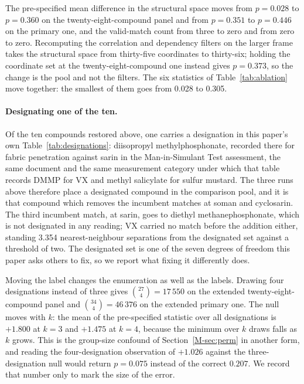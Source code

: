 \documentclass[11pt,a4paper]{article}
\begin{document}
The pre-specified mean difference in the structural space moves from
$p = 0.028$ to $p = 0.360$ on the twenty-eight-compound panel and from
$p = 0.351$ to $p = 0.446$ on the primary one, and the valid-match count from
three to zero and from zero to zero. Recomputing the correlation and dependency
filters on the larger frame takes the structural space from thirty-five
coordinates to thirty-six; holding the coordinate set at the
twenty-eight-compound one instead gives $p = 0.373$, so the change is the pool
and not the filters. The six statistics of Table~\ref{tab:ablation} move
together: the smallest of them goes from 0.028 to 0.305.

\paragraph{Designating one of the ten.} Of the ten compounds restored above,
one carries a designation in this paper's own Table~\ref{tab:designations}:
diisopropyl methylphosphonate, recorded there for fabric penetration against
sarin in the Man-in-Simulant Test assessment, the same document and the same
measurement category under which that table records DMMP for VX and methyl
salicylate for sulfur mustard. The three runs above therefore place a
designated compound in the comparison pool, and it is that compound which
removes the incumbent matches at soman and cyclosarin. The third incumbent
match, at sarin, goes to diethyl methanephosphonate, which is not designated in
any reading; VX carried no match before the addition either, standing 3.354
nearest-neighbour separations from the designated set against a threshold of
two. The designated set
is one of the seven degrees of freedom this paper asks others to fix, so we
report what fixing it differently does.

Moving the label changes the enumeration as well as the labels. Drawing four
designations instead of three gives $\binom{27}{4} = 17\,550$ on the extended
twenty-eight-compound panel and $\binom{34}{4} = 46\,376$ on the extended
primary one. The null moves with $k$: the mean of the pre-specified statistic
over all designations is $+1.800$ at $k=3$ and $+1.475$ at $k=4$, because the
minimum over $k$ draws falls as $k$ grows. This is the group-size confound of
Section~\ref{M-sec:perm} in another form, and reading the four-designation
observation of $+1.026$ against the three-designation null would return
$p = 0.075$ instead of the correct $0.207$. We record that number only to mark
the size of the error.
\end{document}
